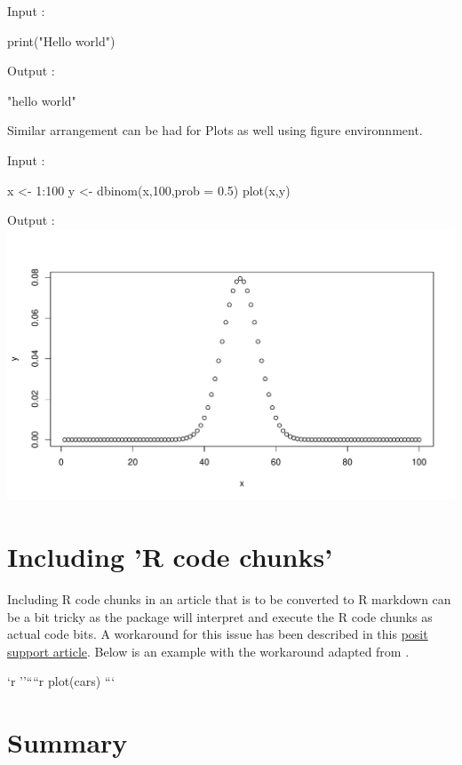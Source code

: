 \begin{Schunk}
Input :
\begin{Sinput}
print("Hello world")
\end{Sinput}
Output :
\begin{Soutput}
[1] "hello world"
\end{Soutput}
\end{Schunk}

Similar arrangement can be had for Plots as well using figure environnment.

\begin{Schunk}
Input :
\begin{Sinput}
x <- 1:100
y <- dbinom(x,100,prob = 0.5)
plot(x,y)
\end{Sinput}
Output :\\
\includegraphics[width=1\textwidth]{binom}
\end{Schunk}

\section{Including 'R code chunks'}

Including R code chunks in an article that is to be converted to R markdown
can be a bit tricky as the  package will interpret and execute the R code chunks as
actual code bits. A workaround for this issue has been described in this \href{https://support.posit.co/hc/en-us/articles/360018181633-Including-verbatim-R-code-chunks-inside-R-Markdown}{posit support article}. Below is an example with the workaround adapted from \cite{rcodechunks}.
\begin{example}
`r ''````{r}
plot(cars)
```
\end{example}

\section{Summary}

